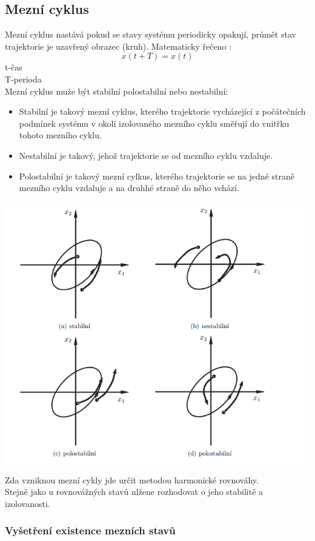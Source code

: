 \subsection{Mezní cyklus}
Mezní cyklus nastává pokud se stavy systému periodicky opakují, průmět stav trajektorie je uzavřený obrazec (kruh).
Matematicky řečeno :
\[x(t+T)=x(t)\]
t-čas \\ T-perioda\\

Mezní cyklus muže být stabilní polostabilní nebo nestabilní:
\begin{itemize}
    \item Stabilní je takový mezní cyklus, kterého trajektorie vycházející z počátečních podmínek systému v okolí izolovaného mezního cyklu směřují do vnitřku tohoto mezního cyklu.
    \item Nestabilní je takový, jehož trajektorie se od mezního cyklu vzdaluje.
    \item Polostabilní je takový mezní cylkus, kterého trajektorie se na jedné straně mezního cyklu vzdaluje a na druhhé straně do něho vchází.
\end{itemize}
\includegraphics{img/mez_cykly.png}

Zda vzniknou mezní cykly jde určit metodou harmonické rovnováhy.\\
Stejně jako u rovnovážných stavů nlžene rozhodovat o jeho stabilitě a izolovanosti.\\
\subsubsection{Vyšetření existence mezních stavů}
